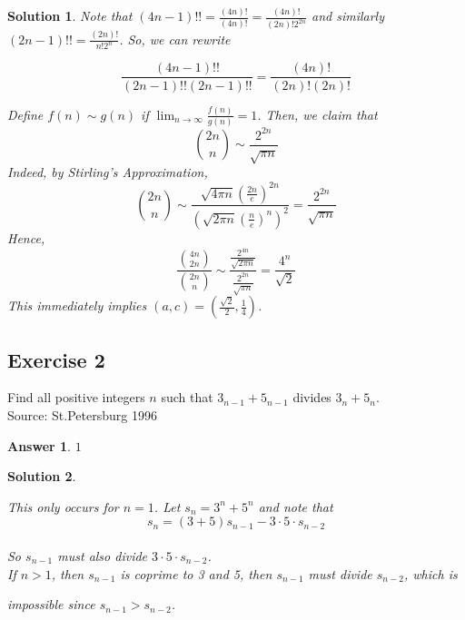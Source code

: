 \documentclass[12pt]{article}
\newtheorem{answer}{Answer}
\newtheorem{solution}{Solution}
\begin{document}
\begin{solution}
Note that \( (4n - 1)!! = \frac{(4n)!}{(4n)!} = \frac{(4n)!}{(2n)! 2^{2n}} \) and similarly \( (2n - 1)!! = \frac{(2n)!}{n! 2^n} \). So, we can rewrite

\[
\frac{(4n - 1)!!}{(2n - 1)!!(2n - 1)!!} = \frac{(4n)!}{(2n)!(2n)!}
\]

Define \( f(n) \sim g(n) \) if \( \lim_{n \to \infty} \frac{f(n)}{g(n)} = 1 \). Then, we claim that
\[
\binom{2n}{n} \sim \frac{2^{2n}}{\sqrt{\pi n}}
\]
Indeed, by Stirling's Approximation,
\[
\binom{2n}{n} \sim \frac{\sqrt{4 \pi n} \left(\frac{2n}{e}\right)^{2n}}{(\sqrt{2 \pi n}\left(\frac{n}{e}\right)^n)^2} = \frac{2^{2n}}{\sqrt{\pi n}}
\]
Hence,
\[
\frac{\binom{4n}{2n}}{\binom{2n}{n}} \sim \frac{\frac{2^{4n}}{\sqrt{2 \pi n}}}{\frac{2^{2n}}{\sqrt{\pi n}}} = \frac{4^n}{\sqrt{2}}
\]
This immediately implies \( (a, c) = \left( \frac{\sqrt{2}}{2}, \frac{1}{4} \right) \).

\end{solution}




\vspace{2in}



\subsection*{Exercise 2}
Find all positive integers $n$ such that $3_{n-1} + 5_{n-1}$ divides $3_n + 5_n$. \\

Source: St.Petersburg 1996
\begin{answer}
$1$

\end{answer}

\begin{solution}
\begin{enumerate}
    

This only occurs for $n = 1$. Let $s_n = 3^n + 5^n$ and note that \\

$$s_n = (3+5)s_{n-1} - 3\cdot 5\cdot s_{n-2}$$\\
So $s_{n-1}$ must also divide $3\cdot 5\cdot s_{n-2}$. \\
If $n > 1$, then $s_{n-1}$ is coprime to 3 and 5, then $s_{n-1}$ must divide $s_{n-2}$, which is 
\end{enumerate}
impossible since $s_{n-1} > s_{n-2}$.


\end{solution}
\end{document}
